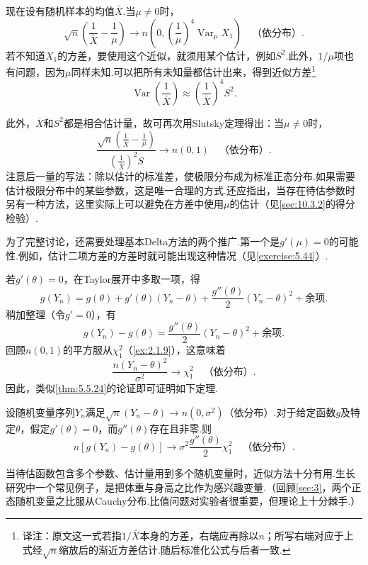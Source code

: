 \begin{example}[续\autoref{ex:5.5.23}]\label{ex:5.5.25}
现在设有随机样本的均值$\bar X$.当$\mu\ne0$时，
$$\sqrt n\left(\frac1{\bar X}-\frac1\mu\right)\to n\left(0,\left(\frac1\mu\right)^4\operatorname{Var}_\mu X_1\right)\quad\text{（依分布）}.$$
若不知道$X_1$的方差，要使用这个近似，就须用某个估计，例如$S^2$.此外，$1/\mu$项也有问题，因为$\mu$同样未知.可以把所有未知量都估计出来，得到近似方差\footnote{译注：原文这一式若指$1/\bar X$本身的方差，右端应再除以$n$；所写右端对应于上式经$\sqrt n$缩放后的渐近方差估计.随后标准化公式与后者一致.}
$$\operatorname{Var}\left(\frac1{\bar X}\right)\approx\left(\frac1{\bar X}\right)^4S^2.$$

此外，$\bar X$和$S^2$都是相合估计量，故可再次用Slutsky定理得出：当$\mu\ne0$时，
$$\frac{\sqrt n\left(\frac1{\bar X}-\frac1\mu\right)}{\left(\frac1{\bar X}\right)^2S}\to n(0,1)\quad\text{（依分布）}.$$
注意后一量的写法：除以估计的标准差，使极限分布成为标准正态分布.如果需要估计极限分布中的某些参数，这是唯一合理的方式.还应指出，当存在待估参数时另有一种方法，这里实际上可以避免在方差中使用$\mu$的估计（见\autoref{sec:10.3.2}的得分检验）.
\end{example}
为了完整讨论，还需要处理基本Delta方法的两个推广.第一个是$g'(\mu)=0$的可能性.例如，估计二项方差的方差时就可能出现这种情况（见\autoref{exercise:5.44}）.

若$g'(\theta)=0$，在Taylor展开中多取一项，得
$$g(Y_n)=g(\theta)+g'(\theta)(Y_n-\theta)+\frac{g''(\theta)}2(Y_n-\theta)^2+\text{余项}.$$
稍加整理（令$g'=0$），有
\begin{equation}\label{eq:5.5.12}
g(Y_n)-g(\theta)=\frac{g''(\theta)}2(Y_n-\theta)^2+\text{余项}.
\end{equation}
回顾$n(0,1)$的平方服从$\chi_1^2$（\autoref{ex:2.1.9}），这意味着
$$\frac{n(Y_n-\theta)^2}{\sigma^2}\to\chi_1^2\quad\text{（依分布）}.$$
因此，类似\autoref{thm:5.5.24}的论证即可证明如下定理.
\begin{theorem}[二阶Delta方法]\label{thm:5.5.26}
设随机变量序列$Y_n$满足$\sqrt n(Y_n-\theta)\to n(0,\sigma^2)$（依分布）.对于给定函数$g$及特定$\theta$，假定$g'(\theta)=0$，而$g''(\theta)$存在且非零.则
\begin{equation}\label{eq:5.5.13}
n[g(Y_n)-g(\theta)]\to\sigma^2\frac{g''(\theta)}2\chi_1^2\quad\text{（依分布）}.
\end{equation}
\end{theorem}
当待估函数包含多个参数、估计量用到多个随机变量时，近似方法十分有用.生长研究中一个常见例子，是把体重与身高之比作为感兴趣变量.（回顾\autoref{sec:3}，两个正态随机变量之比服从Cauchy分布.比值问题对实验者很重要，但理论上十分棘手.）

